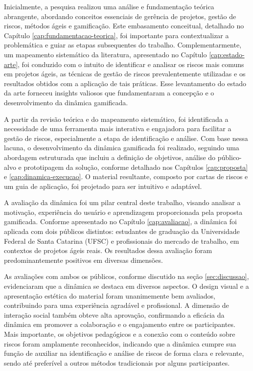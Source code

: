 \documentclass[
	12pt,
	openright,
	twoside,
	a4paper,
	english,
	brazil
	]{abntex2}
\begin{document}
Inicialmente, a pesquisa realizou uma análise e fundamentação teórica abrangente, abordando conceitos essenciais de gerência de projetos, gestão de riscos, métodos ágeis e gamificação. Este embasamento conceitual, detalhado no Capítulo \ref{cap:fundamentacao-teorica}, foi importante para contextualizar a problemática e guiar as etapas subsequentes do trabalho. Complementarmente, um mapeamento sistemático da literatura, apresentado no Capítulo \ref{cap:estado-arte}, foi conduzido com o intuito de identificar e analisar os riscos mais comuns em projetos ágeis, as técnicas de gestão de riscos prevalentemente utilizadas e os resultados obtidos com a aplicação de tais práticas. Esse levantamento do estado da arte forneceu insights valiosos que fundamentaram a concepção e o desenvolvimento da dinâmica gamificada.

A partir da revisão teórica e do mapeamento sistemático, foi identificada a necessidade de uma ferramenta mais interativa e engajadora para facilitar a gestão de riscos, especialmente a etapa de identificação e análise. Com base nessa lacuna, o desenvolvimento da dinâmica gamificada foi realizado, seguindo uma abordagem estruturada que incluiu a definição de objetivos, análise do público-alvo e prototipagem da solução, conforme detalhado nos Capítulos \ref{cap:proposta} e \ref{cap:dinamica-execucao}. O material resultante, composto por cartas de riscos e um guia de aplicação, foi projetado para ser intuitivo e adaptável.

A avaliação da dinâmica foi um pilar central deste trabalho, visando analisar a motivação, experiência do usuário e aprendizagem proporcionada pela proposta gamificada. Conforme apresentado no Capítulo \ref{cap:avaliacao}, a dinâmica foi aplicada com dois públicos distintos: estudantes de graduação da Universidade Federal de Santa Catarina (UFSC) e profissionais do mercado de trabalho, em contextos de projetos ágeis reais. Os resultados dessa avaliação foram predominantemente positivos em diversas dimensões.

As avaliações com ambos os públicos, conforme discutido na seção \ref{sec:discussao}, evidenciaram que a dinâmica se destaca em diversos aspectos. O design visual e a apresentação estética do material foram unanimemente bem avaliados, contribuindo para uma experiência agradável e profissional. A dimensão de interação social também obteve alta aprovação, confirmando a eficácia da dinâmica em promover a colaboração e o engajamento entre os participantes. Mais importante, os objetivos pedagógicos e a conexão com o conteúdo sobre riscos foram amplamente reconhecidos, indicando que a dinâmica cumpre sua função de auxiliar na identificação e análise de riscos de forma clara e relevante, sendo até preferível a outros métodos tradicionais por alguns participantes.
\end{document}

